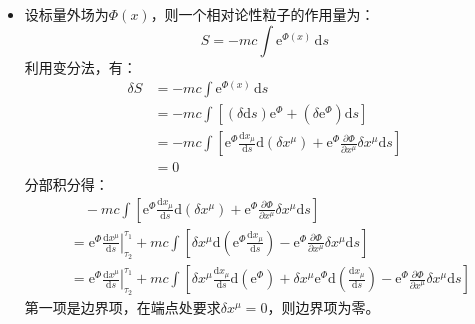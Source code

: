 \documentclass[a4paper,fontset=windows]{ctexart}
\begin{document}
\begin{itemize}
        第二项中，由于$\delta x_\mu$是任意的变分，粒子的运动方程为：
        \[
        \frac{\mathrm{d}^2 x^\mu}{\mathrm{d}s^2} = 0
        \]
        即粒子做匀速直线运动。
        \bigskip

        \item[5.(a)]
        设标量外场为$\varPhi(x)$，则一个相对论性粒子的作用量为：
        \[
        S = -mc\int\mathrm{e}^{\varPhi(x)}\,\mathrm{d}s
        \]
        利用变分法，有：
        \begin{align*}
        \delta S
        &= -mc\int\mathrm{e}^{\varPhi(x)}\,\mathrm{d}s \\
        &= -mc\int\left[(\delta\mathrm{d}s)\mathrm{e}^\varPhi + (\delta\mathrm{e}^\varPhi)\mathrm{d}s\right] \\
        &= -mc\int\left[\mathrm{e}^\varPhi\frac{\mathrm{d}x_\mu}{\mathrm{d}s}\mathrm{d}(\delta x^\mu) + \mathrm{e}^\varPhi\frac{\partial\varPhi}{\partial x^\mu}\delta x^\mu\mathrm{d}s\right] \\
        &= 0
        \end{align*}
        分部积分得：
        \begin{align*}
        &\quad -mc\int\left[\mathrm{e}^\varPhi\frac{\mathrm{d}x_\mu}{\mathrm{d}s}\mathrm{d}(\delta x^\mu) + \mathrm{e}^\varPhi\frac{\partial\varPhi}{\partial x^\mu}\delta x^\mu\mathrm{d}s\right] \\
        &= \left.\mathrm{e}^\varPhi\frac{\mathrm{d}x^\mu}{\mathrm{d}s}\right|_{\tau_2}^{\tau_1} + mc\int\left[\delta x^\mu\mathrm{d}\left(\mathrm{e}^\varPhi\frac{\mathrm{d}x_\mu}{\mathrm{d}s}\right) - \mathrm{e}^\varPhi\frac{\partial\varPhi}{\partial x^\mu}\delta x^\mu\mathrm{d}s\right] \\
        &= \left.\mathrm{e}^\varPhi\frac{\mathrm{d}x^\mu}{\mathrm{d}s}\right|_{\tau_2}^{\tau_1} + mc\int\left[\delta x^\mu\frac{\mathrm{d}x_\mu}{\mathrm{d}s}\mathrm{d}(\mathrm{e}^\varPhi) + \delta x^\mu\mathrm{e}^\varPhi\mathrm{d}\left(\frac{\mathrm{d}x_\mu}{\mathrm{d}s}\right) - \mathrm{e}^\varPhi\frac{\partial\varPhi}{\partial x^\mu}\delta x^\mu\mathrm{d}s\right]
        \end{align*}
        第一项是边界项，在端点处要求$\delta x^\mu = 0$，则边界项为零。


\end{itemize}
\end{document}
